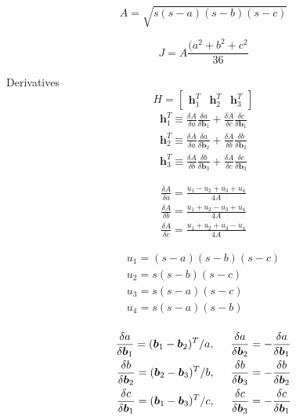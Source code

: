 \documentclass[12pt,a4paper,oneside]{article}
\begin{document}
\begin{equation}
A = \sqrt{s(s-a)(s-b)(s-c)}
\end{equation}

\begin{equation}
J = A\frac{(a^2 + b^2 + c^2}{36}
\end{equation}

Derivatives
\begin{equation}
H = \begin{bmatrix}
\bm{h}_1^T & \bm{h}_2^T & \bm{h}_3^T
\end{bmatrix}
\end{equation}
\begin{subequations}
\begin{align*}
\bm{h}_1^T \equiv \frac{\delta A}{\delta a}\frac{\delta a}{\delta\bm{b}_1} + \frac{\delta A}{\delta c}\frac{\delta c}{\delta\bm{b}_1} \\
\bm{h}_2^T \equiv \frac{\delta A}{\delta a}\frac{\delta a}{\delta\bm{b}_2} + \frac{\delta A}{\delta b}\frac{\delta b}{\delta\bm{b}_2}  \\
\bm{h}_3^T \equiv \frac{\delta A}{\delta b}\frac{\delta b}{\delta\bm{b}_3} + \frac{\delta A}{\delta c}\frac{\delta c}{\delta\bm{b}_3} 
\end{align*}
\end{subequations}

\begin{subequations}
\begin{align*}
\frac{\delta A}{\delta a} = \frac{u_1 - u_2 + u_3 + u_4}{4A} \\
\frac{\delta A}{\delta b} = \frac{u_1 + u_2 - u_3 + u_4}{4A} \\
\frac{\delta A}{\delta c} = \frac{u_1 + u_2 + u_3 - u_4}{4A}
\end{align*}
\end{subequations}

\begin{subequations}
\begin{align*}
u_1 = (s - a)(s - b)(s - c) \\
u_2 = s(s - b)(s - c) \\
u_3 = s(s - a)(s - c) \\
u_4 = s(s - a)(s - b) \\
\end{align*}
\end{subequations}

\begin{subequations}
\begin{align*}
\frac{\delta a}{\delta \bm{b}_1} = (\bm{b}_1 - \bm{b}_2)^T /a, \hspace{0.5cm} \frac{\delta a}{\delta \bm{b}_2} = -\frac{\delta a}{\delta \bm{b}_1} \\
\frac{\delta b}{\delta \bm{b}_2} = (\bm{b}_2 - \bm{b}_3)^T /b, \hspace{0.5cm} \frac{\delta b}{\delta \bm{b}_3} = -\frac{\delta b}{\delta \bm{b}_2} \\
\frac{\delta c}{\delta \bm{b}_1} = (\bm{b}_1 - \bm{b}_3)^T /c, \hspace{0.5cm} \frac{\delta c}{\delta \bm{b}_3} = -\frac{\delta c}{\delta \bm{b}_1}
\end{align*}
\end{subequations}
\end{document}
